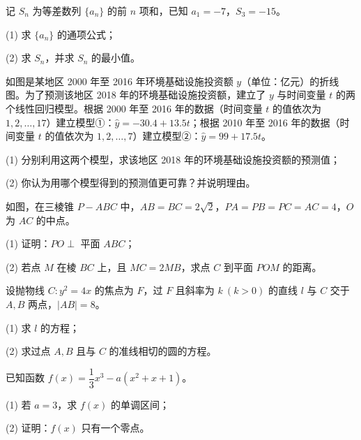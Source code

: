 \begin{question}
记 $S_n$ 为等差数列 $\{a_n\}$ 的前 $n$ 项和，已知 $a_1=-7$，$S_3=-15$。

(1) 求 $\{a_n\}$ 的通项公式；

(2) 求 $S_n$，并求 $S_n$ 的最小值。

\Needspace{0.4\textheight}
\end{question}
\begin{question}
如图是某地区 2000 年至 2016 年环境基础设施投资额 $y$（单位：亿元）的折线图。为了预测该地区 2018 年的环境基础设施投资额，建立了 $y$ 与时间变量 $t$ 的两个线性回归模型。根据 2000 年至 2016 年的数据（时间变量 $t$ 的值依次为 $1,2,\dots,17$）建立模型①：$\hat y=-30.4+13.5t$；根据 2010 年至 2016 年的数据（时间变量 $t$ 的值依次为 $1,2,\dots,7$）建立模型②：$\hat y=99+17.5t$。
\nopagebreak[4]
\begin{center}\end{center}
\nopagebreak[4]
(1) 分别利用这两个模型，求该地区 2018 年的环境基础设施投资额的预测值；

(2) 你认为用哪个模型得到的预测值更可靠？并说明理由。

\Needspace{0.4\textheight}
\end{question}
\begin{question}
如图，在三棱锥 $P-ABC$ 中，$AB=BC=2\sqrt2$，$PA=PB=PC=AC=4$，$O$ 为 $AC$ 的中点。
\nopagebreak[4]
\begin{center}\end{center}
\nopagebreak[4]
(1) 证明：$PO\perp$ 平面 $ABC$；

(2) 若点 $M$ 在棱 $BC$ 上，且 $MC=2MB$，求点 $C$ 到平面 $POM$ 的距离。

\end{question}
\begin{question}
设抛物线 $C: y^2=4x$ 的焦点为 $F$，过 $F$ 且斜率为 $k\ (k>0)$ 的直线 $l$ 与 $C$ 交于 $A,B$ 两点，$|AB|=8$。

(1) 求 $l$ 的方程；

(2) 求过点 $A,B$ 且与 $C$ 的准线相切的圆的方程。

\end{question}
\begin{question}
已知函数 $f(x)=\dfrac13 x^3-a(x^2+x+1)$。

(1) 若 $a=3$，求 $f(x)$ 的单调区间；

(2) 证明：$f(x)$ 只有一个零点。

\end{question}


